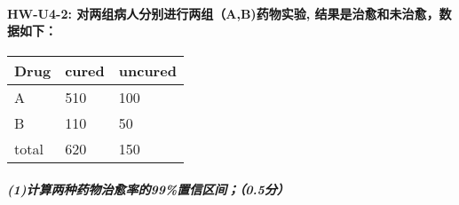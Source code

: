 \documentclass[11pt]{article}
\begin{document}
    \hypertarget{hw-u4-2-ux5bf9ux4e24ux7ec4ux75c5ux4ebaux5206ux522bux8fdbux884cux4e24ux7ec4abux836fux7269ux5b9eux9a8c-ux7ed3ux679cux662fux6cbbux6108ux548cux672aux6cbbux6108ux6570ux636eux5982ux4e0b}{%
\paragraph{HW-U4-2: 对两组病人分别进行两组（A,B)药物实验,
结果是治愈和未治愈，数据如下：}\label{hw-u4-2-ux5bf9ux4e24ux7ec4ux75c5ux4ebaux5206ux522bux8fdbux884cux4e24ux7ec4abux836fux7269ux5b9eux9a8c-ux7ed3ux679cux662fux6cbbux6108ux548cux672aux6cbbux6108ux6570ux636eux5982ux4e0b}}

\begin{longtable}[]{@{}lll@{}}
\toprule
Drug & cured & uncured\tabularnewline
\midrule
\endhead
A & 510 & 100\tabularnewline
B & 110 & 50\tabularnewline
total & 620 & 150\tabularnewline
\bottomrule
\end{longtable}

    \hypertarget{ux8ba1ux7b97ux4e24ux79cdux836fux7269ux6cbbux6108ux7387ux768499ux7f6eux4fe1ux533aux95f40.5ux5206}{%
\subparagraph{(1)计算两种药物治愈率的99\%置信区间；（0.5分）}\label{ux8ba1ux7b97ux4e24ux79cdux836fux7269ux6cbbux6108ux7387ux768499ux7f6eux4fe1ux533aux95f40.5ux5206}}
\end{document}
